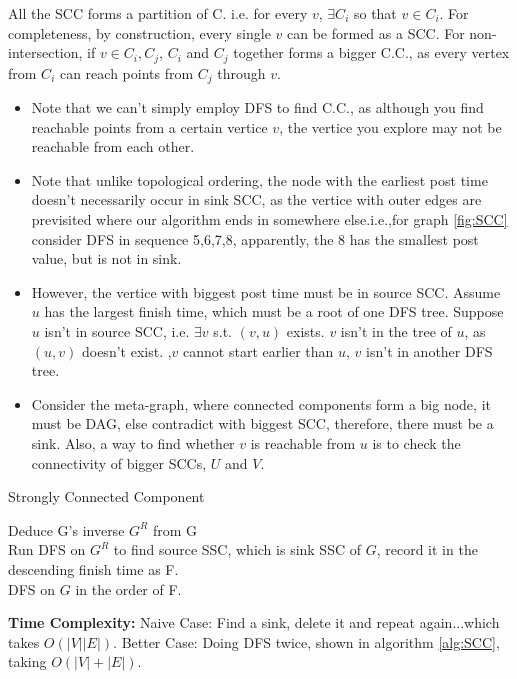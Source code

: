 All the SCC forms a partition of C. i.e. for every $v$, $\exists C_i$ so that $v \in C_i$. For completeness, by construction, every single $v$ can be formed as a SCC. For non-intersection, if $v \in C_i,C_j$, $C_i$ and $C_j$ together forms a bigger C.C., as every vertex from $C_i$ can reach points from $C_j$ through $v$.\\
\begin{itemize}
    \item Note that we can't simply employ DFS to find C.C., as although you find reachable points from a certain vertice $v$, the vertice you explore may not be reachable from each other.
    \item Note that unlike topological ordering, the node with the earliest post time doesn't necessarily occur in sink SCC,
    as the vertice with outer edges are previsited where our algorithm ends in somewhere else.i.e.,for graph \ref{fig:SCC} consider DFS in sequence {5,6,7,8}, apparently, the 8 has the smallest post value, but is not in sink.
    \item However, the vertice with biggest post time must be in source SCC. 
    Assume $u$ has the largest finish time, which must be a root of one DFS tree. Suppose $u$ isn't in source SCC, i.e. $\exists v$ s.t. $(v,u)$ exists. 
    $v$ isn't in the tree of $u$, as $(u,v)$ doesn't exist.
    ,$v$ cannot start earlier than $u$, $v$ isn't in another DFS tree. 
    \item Consider the meta-graph, where connected components form a big node, it must be DAG, else contradict with biggest SCC, therefore, there must be a sink. Also, a way to find whether $v$ is reachable from $u$ is to check the connectivity of bigger SCCs, $U$ and $V$. 
    
\end{itemize}

\begin{algorithm}
    \caption{Strongly Connected Component}
    \label{alg:SCC}
    Deduce G's inverse $G^R$ from G\\
    Run DFS on $G^R$ to find source SSC, which is sink SSC of $G$, record it in the descending finish time as F.\\
    DFS on $G$ in the order of F.

\end{algorithm}
\textbf{Time Complexity:}
Naive Case: Find a sink, delete it and repeat again...which takes $O(|V||E|)$.
Better Case: Doing DFS twice, shown in algorithm \ref{alg:SCC}, taking $O(|V|+|E|)$.





